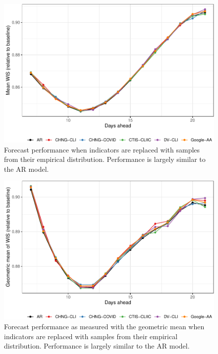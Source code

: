 \documentclass[9pt,twoside,lineno]{pnas-new}
\begin{document}
\clearpage

\begin{figure}

{\centering \includegraphics[width=\textwidth]{fig/fcast-booted-1} 

}

\caption{Forecast performance when indicators are replaced with samples from their empirical distribution. Performance is largely similar to the AR model.}\label{fig:fcast-booted}
\end{figure}

\clearpage

\begin{figure}

{\centering \includegraphics[width=\textwidth]{fig/fcast-booted-adjusted-1} 

}

\caption{Forecast performance as measured with the geometric mean when indicators are replaced with samples from their empirical distribution. Performance is largely similar to the AR model.}\label{fig:fcast-booted-adjusted}
\end{figure}
\end{document}
